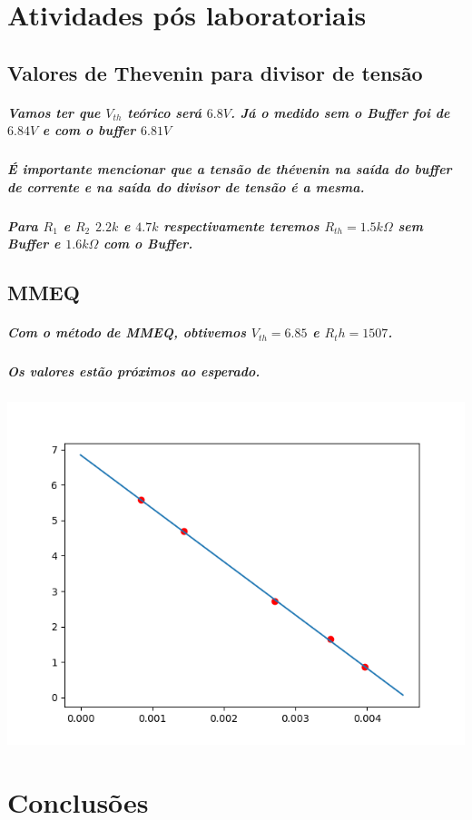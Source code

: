 \documentclass[12pt,twoside, a4paper, twocolumn]{article}
\begin{document}
\section*{Atividades pós laboratoriais}

\subsection{Valores de Thevenin para divisor de tensão}

\subparagraph*{Vamos ter que $V_{th}$ teórico será $6.8V$. Já o medido sem o Buffer foi de $6.84V$ e com o buffer $6.81V$}

\subparagraph*{É importante mencionar que a tensão de thévenin na saída do buffer de corrente e na saída do divisor de tensão é a mesma.}

\subparagraph*{Para $R_1$ e $R_2$ $2.2k$ e $4.7k$ respectivamente teremos $R_{th}= 1.5k \varOmega$ sem Buffer e $1.6k\varOmega$ com o Buffer.}

\subsection{MMEQ}

\subparagraph*{Com o método de MMEQ, obtivemos $V_{th} = 6.85$ e $R_th = 1507$.}

\subparagraph*{Os valores estão próximos ao esperado. }

\begin{adjustbox}{scale=0.6}
    \includegraphics{Figure_1.png}
\end{adjustbox}

\section{Conclusões}
\end{document}
